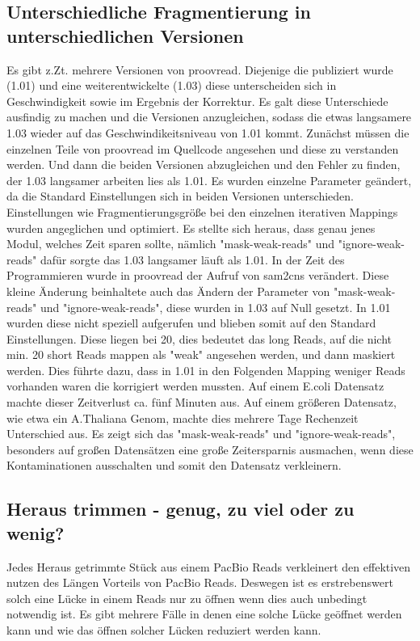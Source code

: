 \documentclass{scrartcl}
\begin{document}
\subsection{Unterschiedliche Fragmentierung in unterschiedlichen Versionen}
\label{sec-7-3}
Es gibt z.Zt. mehrere Versionen von proovread. Diejenige die publiziert wurde (1.01) und eine weiterentwickelte (1.03) diese unterscheiden sich in Geschwindigkeit
sowie im Ergebnis der Korrektur. Es galt diese Unterschiede ausfindig zu machen und die Versionen anzugleichen, sodass die etwas langsamere 1.03 wieder auf 
das Geschwindikeitsniveau von 1.01 kommt. Zunächst müssen die einzelnen Teile von proovread im Quellcode angesehen und diese zu verstanden werden. Und dann die 
beiden Versionen abzugleichen und den Fehler zu finden, der 1.03 langsamer arbeiten lies als 1.01.
Es wurden einzelne Parameter geändert, da die Standard Einstellungen sich in beiden Versionen unterschieden. Einstellungen wie Fragmentierungsgröße
bei den einzelnen iterativen Mappings wurden angeglichen und optimiert. 
Es stellte sich heraus, dass genau jenes Modul, welches Zeit sparen sollte, nämlich "mask-weak-reads" und "ignore-weak-reads" dafür sorgte das 1.03 
langsamer läuft als 1.01. In der Zeit des Programmieren wurde in proovread der Aufruf von sam2cns verändert. Diese kleine Änderung beinhaltete auch das Ändern 
der Parameter von "mask-weak-reads" und "ignore-weak-reads", diese wurden in 1.03 auf Null gesetzt. In 1.01 wurden diese nicht speziell aufgerufen und blieben somit 
auf den Standard Einstellungen. Diese liegen bei 20, dies bedeutet das long Reads, auf die nicht min. 20 short Reads mappen als "weak" angesehen werden, und dann maskiert werden.
Dies führte dazu, dass in 1.01 in den Folgenden Mapping weniger Reads vorhanden waren die korrigiert werden mussten. Auf einem E.coli Datensatz machte dieser
Zeitverlust ca. fünf Minuten aus. Auf einem größeren Datensatz, wie etwa ein A.Thaliana Genom, machte dies mehrere Tage Rechenzeit Unterschied aus. 
Es zeigt sich das "mask-weak-reads" und "ignore-weak-reads", besonders auf großen Datensätzen eine große Zeitersparnis ausmachen, wenn diese Kontaminationen ausschalten
und somit den Datensatz verkleinern. 

\subsection{Heraus trimmen - genug, zu viel oder zu wenig?}
\label{sec-7-4}
Jedes Heraus getrimmte Stück aus einem PacBio Reads verkleinert den effektiven nutzen des Längen Vorteils von PacBio Reads. Deswegen ist es erstrebenswert 
solch eine Lücke in einem Reads nur zu öffnen wenn dies auch unbedingt notwendig ist. Es gibt mehrere Fälle in denen eine solche Lücke geöffnet werden kann
und wie das öffnen solcher Lücken reduziert werden kann.
\end{document}
